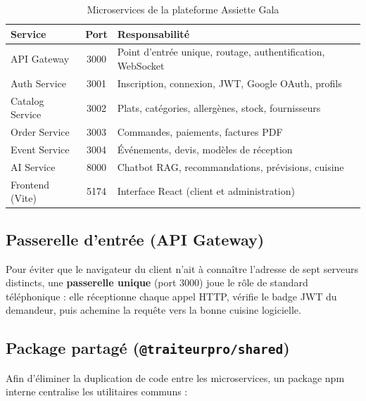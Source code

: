 \begin{table}[H]
    \centering
    \caption{Microservices de la plateforme Assiette Gala}
    \label{tab:microservices}
    \renewcommand{\arraystretch}{1.3}
    \begin{tabular}{|p{3.5cm}|c|p{6cm}|}
        \hline
        \textbf{Service} & \textbf{Port} & \textbf{Responsabilité} \\
        \hline
        API Gateway & 3000 & Point d'entrée unique, routage, authentification, WebSocket \\
        \hline
        Auth Service & 3001 & Inscription, connexion, JWT, Google OAuth, profils \\
        \hline
        Catalog Service & 3002 & Plats, catégories, allergènes, stock, fournisseurs \\
        \hline
        Order Service & 3003 & Commandes, paiements, factures PDF \\
        \hline
        Event Service & 3004 & Événements, devis, modèles de réception \\
        \hline
        AI Service & 8000 & Chatbot RAG, recommandations, prévisions, cuisine \\
        \hline
        Frontend (Vite) & 5174 & Interface React (client et administration) \\
        \hline
    \end{tabular}
\end{table}

\subsection{Passerelle d'entrée (API Gateway)}

Pour éviter que le navigateur du client n'ait à connaître l'adresse de sept serveurs distincts, une \textbf{passerelle unique} (port 3000) joue le rôle de standard téléphonique : elle réceptionne chaque appel HTTP, vérifie le badge JWT du demandeur, puis achemine la requête vers la bonne cuisine logicielle.

\subsection{Package partagé (\texttt{@traiteurpro/shared})}

Afin d'éliminer la duplication de code entre les microservices, un package npm interne centralise les utilitaires communs :

